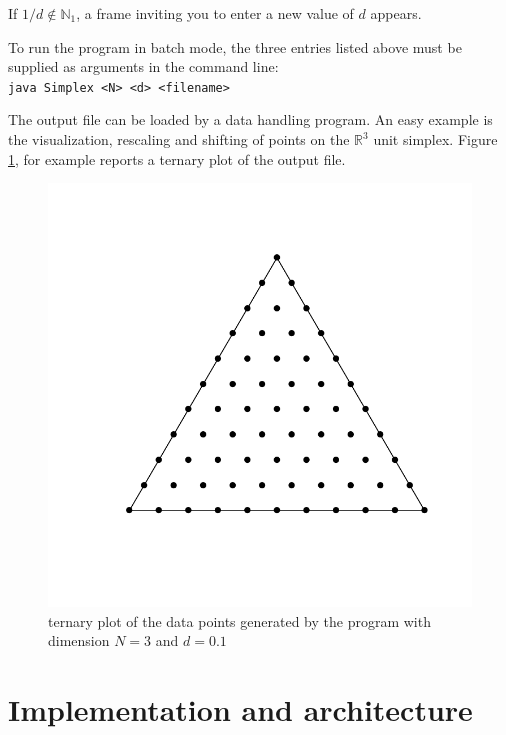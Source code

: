 \documentclass{jors}
\begin{document}
If $1/d  \notin \mathbb{N}_1$, a frame inviting you to enter a new value of $d$ appears.



To run the program in batch mode, the three entries listed above must be supplied as arguments in the command line:\\
\verb+java Simplex <N> <d> <filename>+

The output file can be loaded by a data handling program. 
An easy example is the visualization, rescaling and shifting of points on the $\mathbb{R}^3$ unit simplex.
Figure \ref{fig:ternary}, for example reports a ternary plot of the output file.

\begin{figure}[ht]
	\centering
	\includegraphics[scale=0.5]{fig1.pdf}
	\caption{ternary plot of the data points generated by the program with dimension $N=3$ and $d = 0.1$}
	\label{fig:ternary}
\end{figure}





\section*{Implementation and architecture}
\end{document}
